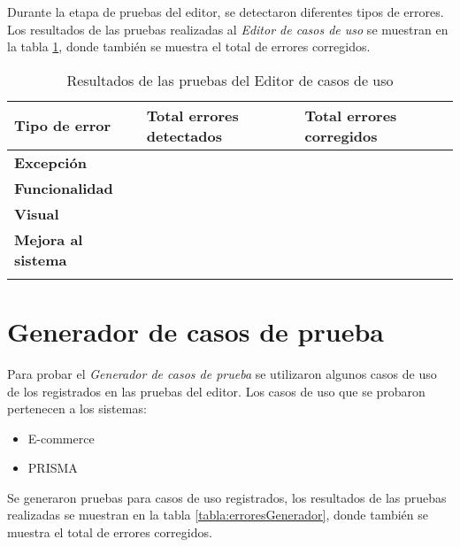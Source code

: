 Durante la etapa de pruebas del editor, se detectaron diferentes tipos de errores. Los resultados de las pruebas
realizadas al {\it Editor de casos de uso} se muestran en la tabla \ref{tabla:erroresEditor}, donde también se muestra el total de errores corregidos.

\begin{longtable}{| p{} | p{} | p{} |}%
	\arrayrulecolor{black}%
	\rowcolor{black}%
	{\color{white}Tipo de error} & {\color{white}Total errores detectados} & {\color{white}Total errores corregidos}\\ \hline
	\endhead%
	\arrayrulecolor{black}%
	{\bf Excepción} & \porcentajeExcepcionEditor & \porcentajeExcepcionCorregidosEditor \\ \hline
	{\bf Funcionalidad} & \porcentajeFuncionalEditor & \porcentajeFuncionalCorregidosEditor \\ \hline
	{\bf Visual} & \porcentajeVisualEditor & \porcentajeVisualCorregidosEditor \\ \hline
	{\bf Mejora al sistema} & \porcentajeMejoraEditor & \porcentajeMejoraCorregidosEditor \\ \hline
	\caption{Resultados de las pruebas del Editor de casos de uso}\label{tabla:erroresEditor}
\end{longtable}%

\section{Generador de casos de prueba}

Para probar el {\it Generador de casos de prueba} se utilizaron algunos casos de uso de los registrados en las pruebas del editor. Los casos de uso que se probaron pertenecen a los sistemas:

\begin{itemize}
 \item E-commerce
 \item PRISMA
\end{itemize}

Se generaron pruebas para \totalCUGenerador casos de uso registrados, los resultados de las pruebas realizadas se muestran en la tabla \ref{tabla:erroresGenerador}, donde también se muestra el total de errores corregidos.


